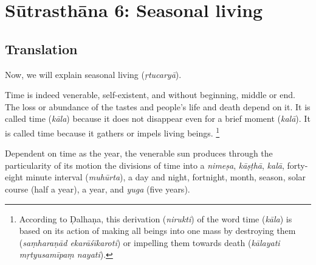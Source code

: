 \chapter{Sūtrasthāna 6: Seasonal living}


\section{Translation}


\begin{translation}

	\item [1]
	Now, we will explain seasonal living (\emph{ṛtucaryā}).


	\item [2]
	Time is indeed venerable, %
	self-existent, and %
	without beginning, middle or end. %
	The loss or abundance of the tastes %
	and people's life and death %
	depend on it. %
	It is called time (\emph{kāla}) because %
	it does not disappear %
	even for a brief moment (\emph{kalā}). %
	It is called time because %
	it gathers or impels living beings.%
	\footnote{According to Ḍalhaṇa, this derivation (\emph{nirukti}) of the word time (\emph{kāla}) is based on its action of making all beings into one mass by destroying them (\emph{saṃharaṇād ekarāśīkaroti}) or impelling them towards death (\emph{kālayati mṛtyusamīpaṃ nayati}).}

	\item [3]
	Dependent on time as the year, %
	the venerable sun %
	produces  %
	through the particularity of its motion %
	the divisions of time %
	into a \emph{nimeṣa}, %
	\emph{kāṣṭhā}, %
	\emph{kalā}, %
	forty-eight minute interval (\emph{muhūrta}), %
	a day and night, %
	fortnight, %
	month, %
	season, %
	solar course (half a year), %
	a year, %
	and \emph{yuga} (five years). %


\end{translation}
